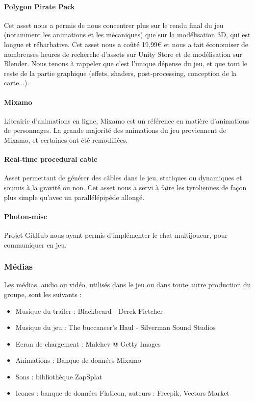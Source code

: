         \paragraph{Polygon Pirate Pack} Cet asset nous a permis de nous concentrer plus sur le rendu final du jeu (notamment 
        les animations et les mécaniques) que sur la modélisation 3D, qui est longue et rébarbative. Cet asset nous a coûté 19,99€ 
        et nous a fait économiser de nombreuses heures de recherche d'assets sur Unity Store et de modélisation sur Blender. 
        Nous tenons à rappeler que c'est l'unique dépense du jeu, et que tout le reste de la partie graphique (effets, shaders,  
        post-processing, conception de la carte...).

        \paragraph{Mixamo} Librairie d'animations en ligne, Mixamo est un référence en matière d'animations de personnages. La grande 
        majorité des animations du jeu proviennent de Mixamo, et certaines ont été remodifiées.

        \paragraph{Real-time procedural cable} Asset permettant de générer des câbles dans le jeu, statiques ou dynamiques et soumis 
        à la gravité ou non. Cet asset nous a servi à faire les tyroliennes de façon plus simple qu'avec un parallélépipède allongé. 

        \paragraph{Photon-misc} Projet GitHub nous ayant permis d'implémenter le chat multijoueur, pour communiquer en jeu.

    \vspace{0.5cm}    
    \subsubsection{Médias}
    \vspace{0.5cm}

        Les médias, audio ou vidéo, utilisés dans le jeu ou dans toute autre production du groupe, sont les suivants :

        \begin{itemize}
            \item Musique du trailer : Blackbeard - Derek Fietcher
            \item Musique du jeu : The buccaneer's Haul - Silverman Sound Studios
            \item Ecran de chargement : Malchev @ Getty Images
            \item Animations : Banque de données Mixamo
            \item Sons : bibliothèque ZapSplat
            \item Icones : banque de données Flaticon, auteurs : Freepik, Vectors Market
        \end{itemize}